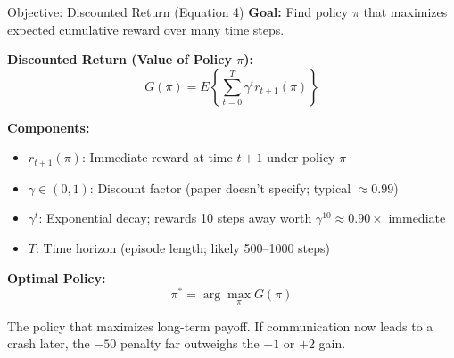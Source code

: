 \documentclass{beamer}
\begin{document}
\begin{frame}{Objective: Discounted Return (Equation 4)}
  \textbf{Goal:} Find policy $\pi$ that maximizes expected cumulative reward over many time steps.

  \vspace{0.2cm}
  \textbf{Discounted Return (Value of Policy $\pi$):}
  $$G(\pi) = E\left\{ \sum_{t=0}^{T} \gamma^t r_{t+1}(\pi) \right\}$$

  \vspace{0.2cm}
  \textbf{Components:}
  \begin{itemize}
    \item $r_{t+1}(\pi)$: Immediate reward at time $t+1$ under policy $\pi$
    \item $\gamma \in (0,1)$: Discount factor (paper doesn't specify; typical $\approx 0.99$)
    \item $\gamma^t$: Exponential decay; rewards 10 steps away worth $\gamma^{10} \approx 0.90\times$ immediate
    \item $T$: Time horizon (episode length; likely 500--1000 steps)
  \end{itemize}

  \vspace{0.2cm}
  \textbf{Optimal Policy:}
  $$\pi^* = \arg\max_\pi G(\pi)$$

  \small The policy that maximizes long-term payoff. If communication now leads to a crash later, the $-50$ penalty far outweighs the $+1$ or $+2$ gain.
\end{frame}
\end{document}
